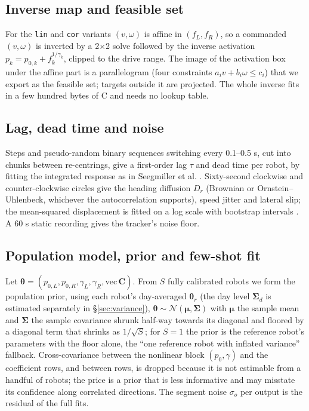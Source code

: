 \subsection{Inverse map and feasible
set}\label{sec:inverse}

For the \texttt{lin} and \texttt{cor} variants \((v, \omega)\) is affine
in \((f_L, f_R)\), so a commanded \((v,\omega)\) is inverted by a 2×2
solve followed by the inverse activation
\(p_k = p_{0,k} + f_k^{1/\gamma_k}\), clipped to the drive range. The
image of the activation box under the affine part is a parallelogram
(four constraints \(a_i v + b_i \omega \le c_i\)) that we export as the
feasible set; targets outside it are projected. The whole inverse
fits in a few hundred bytes of C and needs no lookup table.

\subsection{Lag, dead time and noise}\label{sec:lag}

Steps and pseudo-random binary sequences switching every 0.1--0.5 s, cut
into chunks between re-centrings, give a first-order lag \(\tau\) and
dead time per robot, by fitting the integrated response as in Seegmiller
et al. \cite{seegmiller2013ipem}. Sixty-second clockwise and
counter-clockwise circles give the heading diffusion \(D_r\) (Brownian
or Ornstein--Uhlenbeck, whichever the autocorrelation supports), speed
jitter and lateral slip; the mean-squared displacement is fitted on a
log scale with bootstrap intervals \cite{bailey2022logit}. A 60 s
static recording gives the tracker's noise floor.

\subsection{Population model, prior and few-shot
fit}\label{sec:prior}

Let
\(\boldsymbol\theta = (p_{0,L}, p_{0,R}, \gamma_L, \gamma_R, \mathrm{vec}\,\mathbf C)\).
From \(S\) fully calibrated robots we form the population prior, using
each robot's day-averaged \(\boldsymbol\theta_r\) (the day level
\(\boldsymbol\Sigma_d\) is estimated separately in
§\ref{sec:variance}),
\(\boldsymbol\theta \sim \mathcal N(\boldsymbol\mu, \boldsymbol\Sigma)\)
with \(\boldsymbol\mu\) the sample mean and \(\boldsymbol\Sigma\) the
sample covariance shrunk half-way towards its diagonal and floored by a
diagonal term that shrinks as \(1/\sqrt S\); for \(S = 1\) the prior is
the reference robot's parameters with the floor alone, the ``one
reference robot with inflated variance'' fallback. Cross-covariance
between the nonlinear block \((p_0, \gamma)\) and the coefficient rows,
and between rows, is dropped because it is not estimable from a handful
of robots; the price is a prior that is less informative and may
misstate its confidence along correlated directions. The segment noise
\(\sigma_o\) per output is the residual of the full fits.

